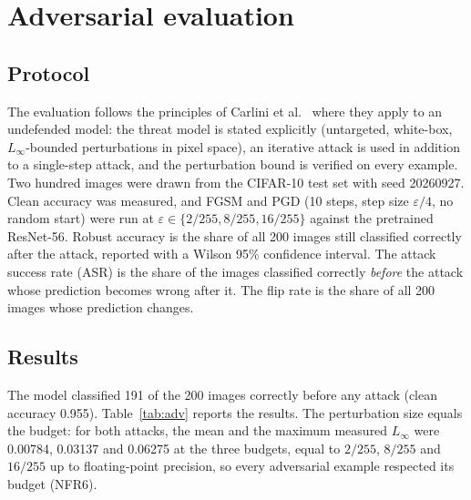 \section{Adversarial evaluation}
\label{sec:eval-adv}

\subsection{Protocol}

The evaluation follows the principles of Carlini et al.~\cite{carlini2019evaluating} where they apply to an undefended model: the threat model is stated explicitly (untargeted, white-box, $L_\infty$-bounded perturbations in pixel space), an iterative attack is used in addition to a single-step attack, and the perturbation bound is verified on every example. Two hundred images were drawn from the CIFAR-10 test set with seed 20260927. Clean accuracy was measured, and FGSM and PGD (10 steps, step size $\varepsilon/4$, no random start) were run at $\varepsilon \in \{2/255, 8/255, 16/255\}$ against the pretrained ResNet-56. Robust accuracy is the share of all 200 images still classified correctly after the attack, reported with a Wilson 95\% confidence interval. The attack success rate (ASR) is the share of the images classified correctly \emph{before} the attack whose prediction becomes wrong after it. The flip rate is the share of all 200 images whose prediction changes.

\subsection{Results}

The model classified 191 of the 200 images correctly before any attack (clean accuracy 0.955). Table~\ref{tab:adv} reports the results. The perturbation size equals the budget: for both attacks, the mean and the maximum measured $L_\infty$ were 0.00784, 0.03137 and 0.06275 at the three budgets, equal to $2/255$, $8/255$ and $16/255$ up to floating-point precision, so every adversarial example respected its budget (NFR6).


